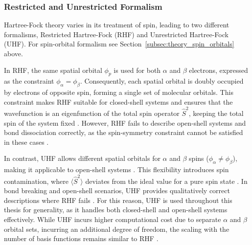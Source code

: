 


\subsubsection{Restricted and Unrestricted Formalism}

Hartree-Fock theory varies in its treatment of spin, leading to two different formalisms, Restricted Hartree-Fock (RHF) and Unrestricted Hartree-Fock (UHF).  For spin-orbital formalism see Section~\ref{subsec:theory_spin_orbitals} above.

In RHF, the same spatial orbital $\phi_p$ is used for both $\alpha$ and $\beta$ electrons, expressed as the constraint $\phi_\alpha = \phi_\beta$. Consequently, each spatial orbital is doubly occupied by electrons of opposite spin, forming a single set of molecular orbitals. This constraint makes RHF suitable for closed-shell systems and ensures that the wavefunction is an eigenfunction of the total spin operator $\hat{S}^2$, keeping the total spin of the system fixed \cite{Helgaker2000}. However, RHF fails to describe open-shell systems and bond dissociation correctly, as the spin-symmetry constraint cannot be satisfied in these cases \cite{Jensen2017}.

In contrast, UHF allows different spatial orbitals for $\alpha$ and $\beta$ spins ($\phi_\alpha \neq \phi_\beta$), making it applicable to open-shell systems \cite{Helgaker2000}. This flexibility introduces spin contamination, where $\langle \hat{S}^2 \rangle$ deviates from the ideal value for a pure spin state \cite{Jensen2017}. In bond breaking and open-shell scenarios, UHF provides qualitatively correct descriptions where RHF fails \cite{Helgaker2000}. For this reason, UHF is used throughout this thesis for generality, as it handles both closed-shell and open-shell systems effectively. While UHF incurs higher computational cost due to separate $\alpha$ and $\beta$ orbital sets, incurring an additional degree of freedom, the scaling with the number of basis functions remains similar to RHF \cite{Helgaker2000}.

